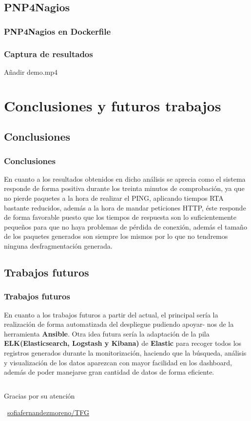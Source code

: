 \documentclass{beamer}
\theoremstyle{plain}
\theoremstyle{definition}
\theoremstyle{plain}
\theoremstyle{definition}
\theoremstyle{remark}
\theoremstyle{definition}
\begin{document}
\subsection{PNP4Nagios}

\begin{frame}
	\frametitle{PNP4Nagios en Dockerfile}
\end{frame}
\begin{frame}
	\frametitle{Captura de resultados}
	Añadir demo.mp4
\end{frame}


\section{Conclusiones y futuros trabajos}
\subsection{Conclusiones}
\begin{frame}
	\frametitle{Conclusiones}
	En cuanto a los resultados obtenidos en dicho análisis se aprecia
	como el sistema responde de forma positiva durante los treinta minutos de
	comprobación, ya que no pierde paquetes a la hora de realizar el PING,
	aplicando tiempos RTA bastante reducidos, además a la hora de mandar
	peticiones HTTP, éste responde de forma favorable puesto que los tiempos
	de respuesta son lo suficientemente pequeños para que no haya problemas
	de pérdida de conexión, además el tamaño de los paquetes generados son
	siempre los mismos por lo que no tendremos ninguna desfragmentación generada.
	
\end{frame}
\subsection{Trabajos futuros}
\begin{frame}
	\frametitle{Trabajos futuros}
En cuanto a los trabajos futuros a partir del actual, el principal
sería la realización de forma automatizada del despliegue pudiendo apoyar-
nos de la herramienta \textbf{Ansible}. Otra idea futura sería la adaptación de la
pila \textbf{ELK(Elasticsearch, Logstash y Kibana)} de \textbf{Elastic} para recoger todos
los registros generados durante la monitorización, haciendo que la búsqueda, análisis y visualización de los datos aparezcan con mayor facilidad en
los dashboard, además de poder manejarse gran cantidad de datos de forma
eficiente.	
\end{frame}
\subsection{}
\begin{frame}{}{}
	\Huge{\centerline{Gracias por su atención}}
	\centerline{\Huge{\raisebox{-.25\height}\faGithub}~\large{\href{https://github.com/sofiafernandezmoreno/TFG}{\alert{sofiafernandezmoreno/TFG}}}}

\end{frame}
\end{document}
